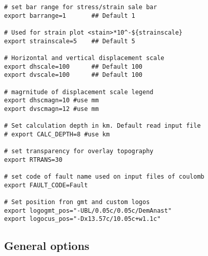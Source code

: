 \begin{enumerate}
\begin{verbatim}
# set bar range for stress/strain sale bar
export barrange=1		## Default 1

# Used for strain plot <stain>*10^-${strainscale}
export strainscale=5    ## Default 5

# Horizontal and vertical displacement scale
export dhscale=100		## Default 100
export dvscale=100		## Default 100

# magrnitude of displacement scale legend
export dhscmagn=10 #use mm
export dvscmagn=12 #use mm

# Set calculation depth in km. Default read input file
# export CALC_DEPTH=8 #use km

# set transparency for overlay topography
export RTRANS=30 

# set code of fault name used on input files of coulomb
export FAULT_CODE=Fault

# Set position fron gmt and custom logos
export logogmt_pos="-UBL/0.05c/0.05c/DemAnast"
export logocus_pos="-Dx13.57c/10.05c+w1.1c"
\end{verbatim}
\end{enumerate}

\subsection{General options}\label{general-options}

